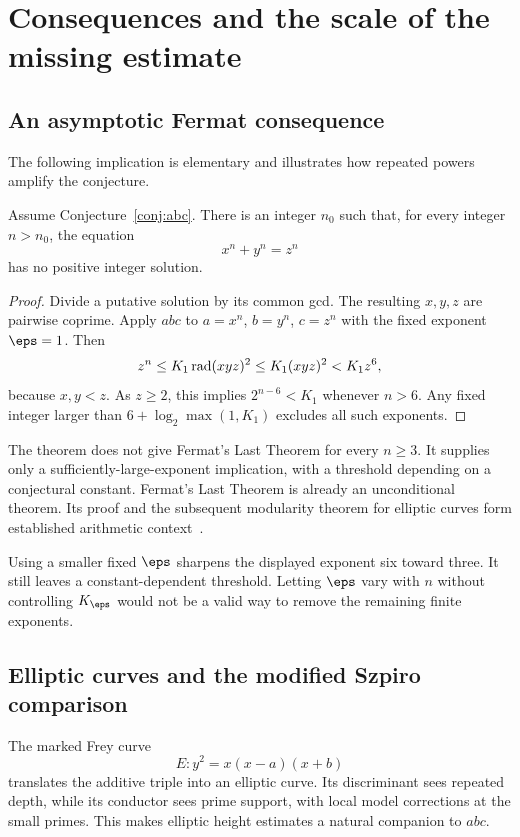 \clearpage
\section{Consequences and the scale of the missing estimate}\label{sec:consequences}
\subsection{An asymptotic Fermat consequence}
The following implication is elementary and illustrates how repeated powers amplify the conjecture.
\begin{theorem}
Assume Conjecture~\ref{conj:abc}. There is an integer $n_0$ such that, for every integer $n>n_0$, the equation
\[
 x^n+y^n=z^n
\]
has no positive integer solution.
\end{theorem}
\begin{proof}
Divide a putative solution by its common gcd. The resulting $x,y,z$ are pairwise coprime. Apply $abc$ to $a=x^n$, $b=y^n$, $c=z^n$ with the fixed exponent $\eps=1$. Then
\[
 z^n\le K_1\operatorname{rad}(xyz)^2\le K_1(xyz)^2<K_1z^6,
\]
because $x,y<z$. As $z\ge2$, this implies $2^{n-6}<K_1$ whenever $n>6$. Any fixed integer larger than $6+\log_2\max(1,K_1)$ excludes all such exponents.
\end{proof}
The theorem does not give Fermat's Last Theorem for every $n\ge3$. It supplies only a sufficiently-large-exponent implication, with a threshold depending on a conjectural constant. Fermat's Last Theorem is already an unconditional theorem. Its proof and the subsequent modularity theorem for elliptic curves form established arithmetic context~\cite{Wiles,TaylorWiles,BCDT}.

Using a smaller fixed $\eps$ sharpens the displayed exponent six toward three. It still leaves a constant-dependent threshold. Letting $\eps$ vary with $n$ without controlling $K_\eps$ would not be a valid way to remove the remaining finite exponents.

\subsection{Elliptic curves and the modified Szpiro comparison}
The marked Frey curve
\[
 E:y^2=x(x-a)(x+b)
\]
translates the additive triple into an elliptic curve. Its discriminant sees repeated depth, while its conductor sees prime support, with local model corrections at the small primes. This makes elliptic height estimates a natural companion to $abc$.

